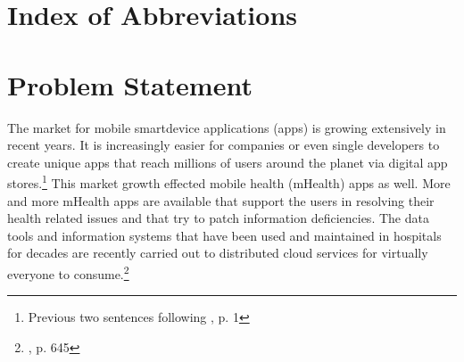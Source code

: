 \documentclass[
	a4paper,
	oneside,
	12pt,
	liststotocnumbered
]{article}
\let\cite\textcite
\begin{document}
\renewcommand{\figurename}{Figure}
\renewcommand{\tablename}{Table}
\renewcommand\thefigure{\arabic{section}-\arabic{figure}}
\renewcommand\thetable{Tab. \arabic{section}-\arabic{table}}
\newcommand{\todo}[1]{\textbf{\textsc{\textcolor{red}{TODO: #1}}}}

\newcommand{\mH}{mHealth }
\newcommand{\ap}{app provider}
\newcommand{\pp}{privacy policy}
\newcommand{\pps}{privacy policies}
\newcommand{\sca}{static code analysis}
\newcommand{\Sca}{Static code analysis}




\tableofcontents
\newpage

\section*{Index of Abbreviations}
\begin{acronym}[TTTTTTTTTTTTTTTTTTTT]
\end{acronym}
\newpage

\normalsize
{}

\section{Problem Statement}
The market for mobile smartdevice applications (apps) is growing extensively in recent years.
It is increasingly easier for companies or even single developers to create unique apps that reach millions of users around the planet via digital app stores.\footnote{Previous two sentences following \cite{Enck2011}, p. 1}
This market growth effected mobile health (\acs{mHealth}) apps as well. 
More and more \mH apps are available that support the users in resolving their health related issues and that try to patch information deficiencies. 
The data tools and information systems that have been used and maintained in hospitals for decades are recently carried out to distributed cloud services for virtually everyone to consume.\footnote{\cite{He2014a}, p. 645}
\end{document}
